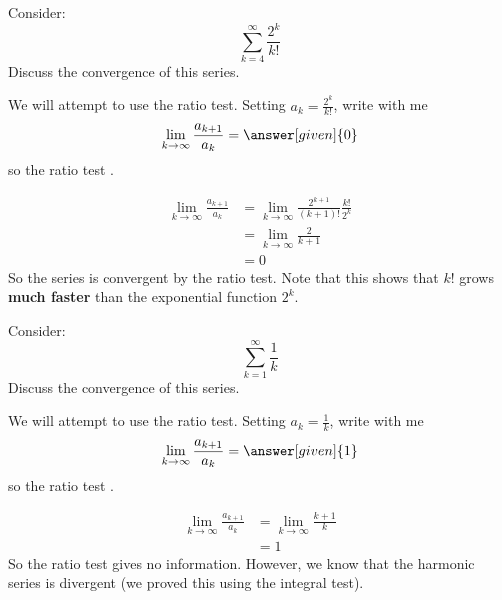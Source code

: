 \documentclass{ximera}
\begin{document}
\begin{example}
  Consider:
  \[
  \sum_{k=4}^\infty \frac{2^k}{k!}
  \]
  Discuss the convergence of this series.
  \begin{explanation}
    We will attempt to use the ratio test. Setting $a_k = \frac{2^k}{k!}$, write with me
    \[
    \lim_{k \to \infty} \frac{a_{k+1}}{a_k} = \answer[given]{0}
    \]
    so the ratio test
	 .	
	 \begin{hint}
	   \begin{align*}
	     \lim_{k \to \infty} \frac{a_{k+1}}{a_k} &= \lim_{k \to \infty} \frac{2^{k+1}}{(k+1)!} \frac{k!}{2^k}\\
	     &=\lim_{k \to \infty} \frac{2}{k+1}\\
	     &=0
	   \end{align*}
	   So the series is convergent by the ratio test.  Note that
           this shows that $k!$ grows \textbf{much faster} than the
           exponential function $2^k$.
	 \end{hint}
  \end{explanation}
\end{example}



\begin{example}
  Consider: 
  \[
  \sum_{k=1}^\infty \frac{1}{k}
  \]
  Discuss the convergence of this series.
  \begin{explanation}
    We will attempt to use the ratio test. Setting $a_k =
    \frac{1}{k}$, write with me
    \[
    \lim_{k \to \infty} \frac{a_{k+1}}{a_k} = \answer[given]{1}
    \]
    so the ratio test
	 .
	 \begin{hint}
           \begin{align*}
	     \lim_{k \to \infty} \frac{a_{k+1}}{a_k} &= \lim_{k \to \infty} \frac{k+1}{k}\\
	     &=1
	   \end{align*}
	   So the ratio test gives no information.
	   However, we know that the harmonic series is divergent (we proved this using the integral test).
	 \end{hint}
  \end{explanation}
\end{example}
\end{document}

